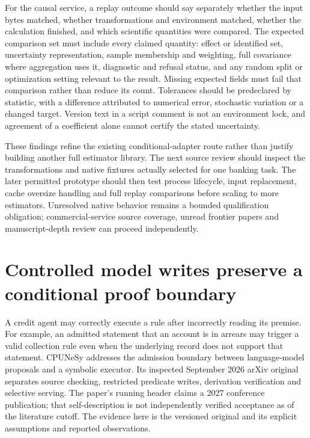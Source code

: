 For the causal service, a replay outcome should say separately whether the
input bytes matched, whether transformations and environment matched, whether
the calculation finished, and which scientific quantities were compared.
The expected comparison set must include every claimed quantity: effect or
identified set, uncertainty representation, sample membership and weighting,
full covariance where aggregation uses it, diagnostic and refusal status,
and any random split or optimization setting relevant to the result. Missing
expected fields must fail that comparison rather than reduce its count.
Tolerances should be predeclared by statistic, with a difference attributed to
numerical error, stochastic variation or a changed target. Version text in a
script comment is not an environment lock, and agreement of a coefficient
alone cannot certify the stated uncertainty.

These findings refine the existing conditional-adapter route rather than
justify building another full estimator library. The next source review should
inspect the transformations and native fixtures actually selected for one
banking task. The later permitted prototype should then test process lifecycle,
input replacement, cache oversize handling and full replay comparisons before
scaling to more estimators. Unresolved native behavior remains a bounded
qualification obligation; commercial-service source coverage, unread frontier
papers and manuscript-depth review can proceed independently.


\section{Controlled model writes preserve a conditional proof boundary}
\label{exec23:controlled-writes-scope}
A credit agent may correctly execute a rule after incorrectly reading its
premise. For example, an admitted statement that an account is in arrears
may trigger a valid collection rule even when the underlying record does
not support that statement. CPUNeSy addresses the admission boundary between
language-model proposals and a symbolic executor. Its inspected September
2026 arXiv original separates source checking, restricted predicate writes,
derivation verification and selective serving. The paper's running header
claims a 2027 conference publication; that self-description is not independently
verified acceptance as of the literature cutoff. The evidence here is the
versioned original and its explicit assumptions and reported observations.
\citep{exec23_controlled_writes_paper}

